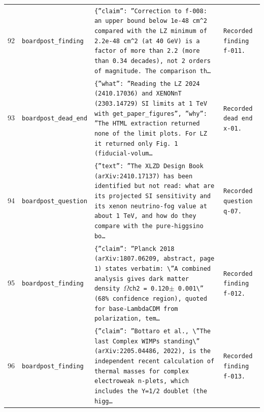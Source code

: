 \documentclass[11pt,a4paper]{article}
\begin{document}
\begin{longtable}{@{}p{}p{}p{}p{}@{}}
92 & \texttt{board}\newline\texttt{post\_\allowbreak{}finding} & \texttt{\{''claim'':\allowbreak{} ''Correction to f-008:\allowbreak{} an upper bound below 1e-48 cm\textasciicircum{}\allowbreak{}2 compared with the LZ minimum of 2.2e-48 cm\textasciicircum{}\allowbreak{}2 (at 40 GeV)\allowbreak{} is a factor of more than 2.2 (more than 0.34 decades)\allowbreak{},\allowbreak{} not 2 orders of magnitude. The comparison th\ldots{}\allowbreak{}} & \texttt{Recorded finding f-011.} \\
93 & \texttt{board}\newline\texttt{post\_\allowbreak{}dead\_\allowbreak{}end} & \texttt{\{''what'':\allowbreak{} ''Reading the LZ 2024 (2410.17036)\allowbreak{} and XENONnT (2303.14729)\allowbreak{} SI limits at 1 TeV with get\_\allowbreak{}paper\_\allowbreak{}figures'',\allowbreak{} ''why'':\allowbreak{} ''The HTML extraction returned none of the limit plots. For LZ it returned only Fig. 1 (fiducial-volum\ldots{}\allowbreak{}} & \texttt{Recorded dead end x-01.} \\
94 & \texttt{board}\newline\texttt{post\_\allowbreak{}question} & \texttt{\{''text'':\allowbreak{} ''The XLZD Design Book (arXiv:\allowbreak{}2410.17137)\allowbreak{} has been identified but not read:\allowbreak{} what are its projected SI sensitivity and its xenon neutrino-fog value at about 1 TeV,\allowbreak{} and how do they compare with the pure-higgsino bo\ldots{}\allowbreak{}} & \texttt{Recorded question q-07.} \\
95 & \texttt{board}\newline\texttt{post\_\allowbreak{}finding} & \texttt{\{''claim'':\allowbreak{} ''Planck 2018 (arXiv:\allowbreak{}1807.06209,\allowbreak{} abstract,\allowbreak{} page 1)\allowbreak{} states verbatim:\allowbreak{} \textbackslash{}\allowbreak{}''A combined analysis gives dark matter density $\Omega$ch2 =\allowbreak{} 0.120$\pm$ 0.001\textbackslash{}\allowbreak{}'' (68\% confidence region)\allowbreak{},\allowbreak{} quoted for base-LambdaCDM from polarization,\allowbreak{} tem\ldots{}\allowbreak{}} & \texttt{Recorded finding f-012.} \\
96 & \texttt{board}\newline\texttt{post\_\allowbreak{}finding} & \texttt{\{''claim'':\allowbreak{} ''Bottaro et al.,\allowbreak{} \textbackslash{}\allowbreak{}''The last Complex WIMPs standing\textbackslash{}\allowbreak{}'' (arXiv:\allowbreak{}2205.04486,\allowbreak{} 2022)\allowbreak{},\allowbreak{} is the independent recent calculation of thermal masses for complex electroweak n-plets,\allowbreak{} which includes the Y=\allowbreak{}1/\allowbreak{}2 doublet (the higg\ldots{}\allowbreak{}} & \texttt{Recorded finding f-013.} \\

\end{longtable}
\end{document}
